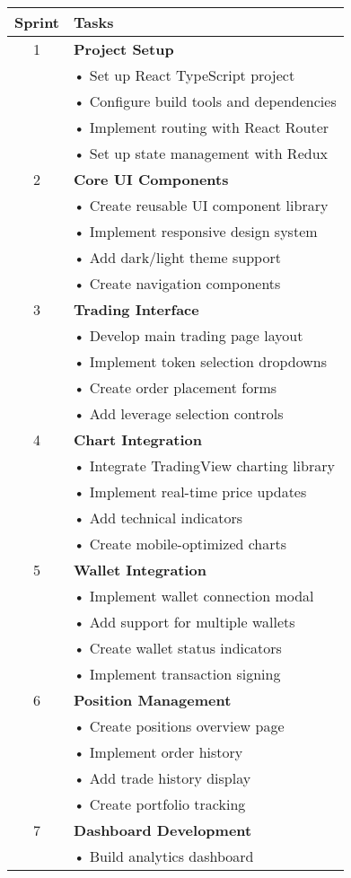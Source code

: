 \documentclass{article}
\begin{document}
\begin{longtable}{|c|p{}|}
\hline
\textbf{Sprint} & \textbf{Tasks} \\
\hline
1 & \textbf{Project Setup}\\
& • Set up React TypeScript project\\
& • Configure build tools and dependencies\\
& • Implement routing with React Router\\
& • Set up state management with Redux\\
\hline
2 & \textbf{Core UI Components}\\
& • Create reusable UI component library\\
& • Implement responsive design system\\
& • Add dark/light theme support\\
& • Create navigation components\\
\hline
3 & \textbf{Trading Interface}\\
& • Develop main trading page layout\\
& • Implement token selection dropdowns\\
& • Create order placement forms\\
& • Add leverage selection controls\\
\hline
4 & \textbf{Chart Integration}\\
& • Integrate TradingView charting library\\
& • Implement real-time price updates\\
& • Add technical indicators\\
& • Create mobile-optimized charts\\
\hline
5 & \textbf{Wallet Integration}\\
& • Implement wallet connection modal\\
& • Add support for multiple wallets\\
& • Create wallet status indicators\\
& • Implement transaction signing\\
\hline
6 & \textbf{Position Management}\\
& • Create positions overview page\\
& • Implement order history\\
& • Add trade history display\\
& • Create portfolio tracking\\
\hline
7 & \textbf{Dashboard Development}\\
& • Build analytics dashboard\\

\end{longtable}
\end{document}
